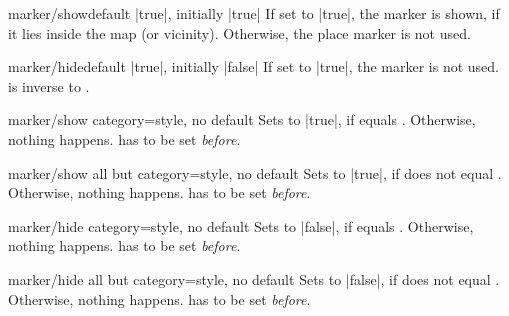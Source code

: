 \clearpage

\begin{docMrcKey}{marker/show}{}{default |true|, initially |true|}
  If set to |true|, the marker is shown, if it lies inside the map (or vicinity).
  Otherwise, the place marker is not used.
\end{docMrcKey}


\begin{docMrcKey}{marker/hide}{}{default |true|, initially |false|}
  If set to |true|, the marker is not used.
   is inverse to .
\end{docMrcKey}



\begin{docMrcKey}{marker/show category}{=}{style, no default}
  Sets  to |true|, if  equals .
  Otherwise, nothing happens.
   has to be set \emph{before}.
\end{docMrcKey}


\begin{docMrcKey}{marker/show all but category}{=}{style, no default}
  Sets  to |true|, if  does not equal .
  Otherwise, nothing happens.
   has to be set \emph{before}.
\end{docMrcKey}


\begin{docMrcKey}{marker/hide category}{=}{style, no default}
  Sets  to |false|, if  equals .
  Otherwise, nothing happens.
   has to be set \emph{before}.
\end{docMrcKey}


\begin{docMrcKey}{marker/hide all but category}{=}{style, no default}
  Sets  to |false|, if  does not equal .
  Otherwise, nothing happens.
   has to be set \emph{before}.
  \begin{dispExample}
  \end{dispExample}
\end{docMrcKey}


